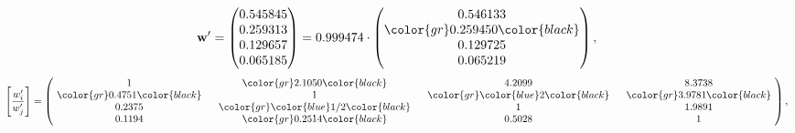 \begin{example}
\begin{equation*}
\mathbf{w}^{\prime} =
\begin{pmatrix}
0.545845\\
0.259313\\
0.129657\\
0.065185
\end{pmatrix} =
0.999474\cdot
\begin{pmatrix}
0.546133\\
\color{gr} 0.259450\color{black} \\
0.129725\\
0.065219
\end{pmatrix},
\end{equation*}
\begin{equation*}
\left[ \frac{{w}^{\prime}_i}{{w}^{\prime}_j} \right] =
\begin{pmatrix}
$\,\,$ 1 $\,\,$ & $\,\,$\color{gr} 2.1050\color{black} $\,\,$ & $\,\,$4.2099$\,\,$ & $\,\,$8.3738$\,\,$ \\
$\,\,$\color{gr} 0.4751\color{black} $\,\,$ & $\,\,$ 1 $\,\,$ & $\,\,$\color{gr} \color{blue} 2\color{black} $\,\,$ & $\,\,$\color{gr} 3.9781\color{black}   $\,\,$ \\
$\,\,$0.2375$\,\,$ & $\,\,$\color{gr} \color{blue}  1/2\color{black} $\,\,$ & $\,\,$ 1 $\,\,$ & $\,\,$1.9891 $\,\,$ \\
$\,\,$0.1194$\,\,$ & $\,\,$\color{gr} 0.2514\color{black} $\,\,$ & $\,\,$0.5028$\,\,$ & $\,\,$ 1  $\,\,$ \\
\end{pmatrix},
\end{equation*}
\end{example}
\newpage
